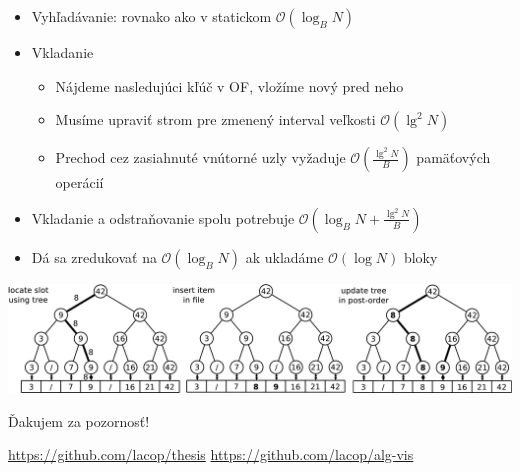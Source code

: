 \documentclass{beamer}
\newcommand{\bigO}{\ensuremath{\mathcal{O}}}
\begin{document}
\begin{frame}
    \begin{itemize}
        \item Vyhľadávanie: rovnako ako v statickom $\bigO(\log_B N)$
        \item Vkladanie
        \begin{itemize}
            \item Nájdeme nasledujúci kľúč v OF, vložíme nový pred neho
            \item Musíme upraviť strom pre zmenený interval veľkosti $\bigO(\lg^2 N)$
            \item Prechod cez zasiahnuté vnútorné uzly vyžaduje $\bigO(\frac{\lg^2 N}{B})$ pamäťových operácií
        \end{itemize}
        \item Vkladanie a odstraňovanie spolu potrebuje $\bigO(\log_B N + \frac{\lg^2 N}{B})$
        \item Dá sa zredukovať na $\bigO(\log_B N)$ ak ukladáme $\bigO(\log N)$ bloky
    \end{itemize}
    \begin{center}
        \includegraphics[width=\textwidth]{../figures/downloaded_dont_use/dyn-insert.pdf}
    \end{center}
\end{frame}

\begin{frame}[plain]
\begin{center}
{\Large Ďakujem za pozornosť!}
\vspace{10em}

\url{https://github.com/lacop/thesis} 
\url{https://github.com/lacop/alg-vis}
\end{center}
\end{frame}
\end{document}
